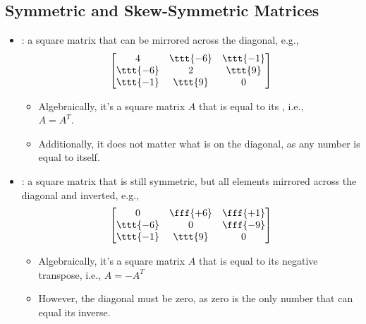 \begin{itemize}
  \subsection{Symmetric and Skew-Symmetric Matrices}\label{Symmetric and Skew-Symmetric Matrices}
  \begin{itemize}
    \item {}: a square matrix that can be mirrored across the diagonal, e.g.,
    \[%
    \begin{bmatrix}
    4 & \ttt{-6} & \ttt{-1} \\
    \ttt{-6} & 2 & \ttt{9} \\
    \ttt{-1} & \ttt{9} &  0
    \end{bmatrix}
    \]%
      \begin{itemize}
        \item Algebraically, it's a square matrix \(A\) that is equal to its \hyperref[tbd]{}, i.e., \\ \(A = A^T\).
        \item Additionally, it does not matter what is on the diagonal, as any number is equal to itself. 
      \end{itemize}
    \item {}: a square matrix that is still symmetric, but all elements mirrored across the diagonal and inverted, e.g.,
    \[%
    \begin{bmatrix}
    0 & \fff{+6} & \fff{+1} \\
    \ttt{-6} & 0 & \fff{-9} \\
    \ttt{-1} & \ttt{9} &  0
    \end{bmatrix}
    \]%
    \begin{itemize}
      \item Algebraically, it's a square matrix \(A\) that is equal to its negative transpose, i.e., \(A = -A^T\)
      \item However, the diagonal must be zero, as zero is the only number that can equal its inverse. 
    \end{itemize}
  \end{itemize}
  

\end{itemize}
